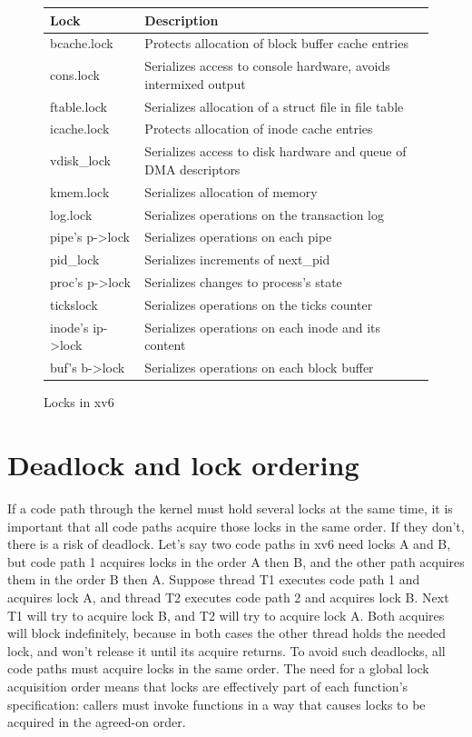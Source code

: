 \begin{figure}[t]
\center
\begin{tabular}{ll}
{\bf Lock} & {\bf Description} \\
\midrule
bcache.lock & Protects allocation of block buffer cache entries \\
cons.lock & Serializes access to console hardware, avoids intermixed output \\
ftable.lock & Serializes allocation of a struct file in file table \\
icache.lock & Protects allocation of inode cache entries \\
vdisk\_lock & Serializes access to disk hardware and queue of DMA descriptors \\
kmem.lock & Serializes allocation of memory \\
log.lock & Serializes operations on the transaction log \\
pipe's p->lock & Serializes operations on each pipe \\
pid\_lock & Serializes increments of next\_pid \\
proc's p->lock & Serializes changes to process's state \\
tickslock & Serializes operations on the ticks counter \\
inode's ip->lock & Serializes operations on each inode and its content \\
buf's b->lock & Serializes operations on each block buffer \\
\end{tabular}
\caption{Locks in xv6}
\label{fig:locktable}
\end{figure}
\section{Deadlock and lock ordering}
If a code path through the kernel must hold several locks at the same time, it is
important that all code paths acquire those locks in the same order.  If
they don't, there is a risk of deadlock.  Let's say two code paths in
xv6 need locks A and B, but code path 1 acquires locks in the order A
then B, and the other path acquires them in the order B then A.
Suppose thread T1 executes code path 1 and acquires lock A,
and thread T2 executes code path 2 and acquires lock B.
Next T1 will try to acquire lock B, and T2 will try to acquire lock A.
Both acquires will block indefinitely, because in both cases the
other thread holds the needed lock, and won't release it until
its acquire returns.
To avoid such deadlocks, all code paths must acquire
locks in the same order. The need for a global lock acquisition order
means that locks are effectively part of each function's specification: 
callers must invoke functions in a way that causes locks to be acquired
in the agreed-on order.

